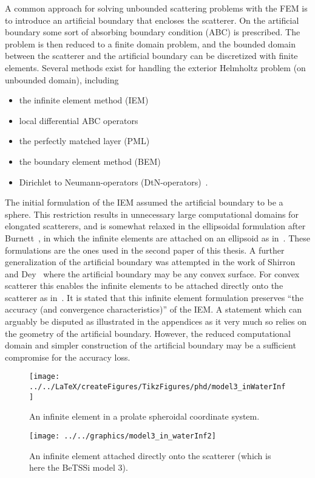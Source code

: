 A common approach for solving unbounded scattering problems with the FEM is to introduce an artificial boundary that encloses the scatterer. On the artificial boundary some sort of absorbing boundary condition (ABC) is prescribed. The problem is then reduced to a finite domain problem, and the bounded domain between the scatterer and the artificial boundary can be discretized with finite elements. Several methods exist for handling the exterior Helmholtz problem (on unbounded domain), including
\begin{itemize}
	\item the infinite element method (IEM)~\cite{Bettess1977ie,Bettess1977dar}
	\item local differential ABC operators~\cite{Shirron1995soe,Bayliss1982bcf,Hagstrom1998afo,Tezaur2001tdf}
	\item the perfectly matched layer (PML)~\cite{Berenger1994apm,Berenger1996pml}
	\item the boundary element method (BEM)~\cite{Sauter2011bem,Schanz2007bea,Marburg2008cao,Chandler_Wilde2012nab}
	\item Dirichlet to Neumann-operators (DtN-operators)~\cite{Givoli2013nmf}.
\end{itemize}
The initial formulation of the IEM assumed the artificial boundary to be a sphere. This restriction results in unnecessary large computational domains for elongated scatterers, and is somewhat relaxed in the ellipsoidal formulation after Burnett~\cite{Burnett1994atd,Burnett1998aea}, in which the infinite elements are attached on an ellipsoid as in~. These formulations are the ones used in the second paper of this thesis. A further generalization of the artificial boundary was attempted in the work of Shirron and Dey~\cite{Shirron2002aie} where the artificial boundary may be any convex surface. For convex scatterer this enables the infinite elements to be attached directly onto the scatterer as in~. It is stated that this infinite element formulation preserves ``the accuracy (and convergence characteristics)'' of the IEM. A statement which can arguably be disputed as illustrated in the appendices as it very much so relies on the geometry of the artificial boundary. However, the reduced computational domain and simpler construction of the artificial boundary may be a sufficient compromise for the accuracy loss. 

\begin{figure}
	\centering
	\texttt{[image: ../../LaTeX/createFigures/TikzFigures/phd/model3\_inWaterInf]}
	\caption{An infinite element in a prolate spheroidal coordinate system.}
	\label{Fig:model3_inWaterInf}
\end{figure}
\begin{figure}
	\centering
	\texttt{[image: ../../graphics/model3\_in\_waterInf2]}
	\caption{An infinite element attached directly onto the scatterer (which is here the BeTSSi model 3).}
	\label{Fig:model3_in_waterInf2}
\end{figure}

